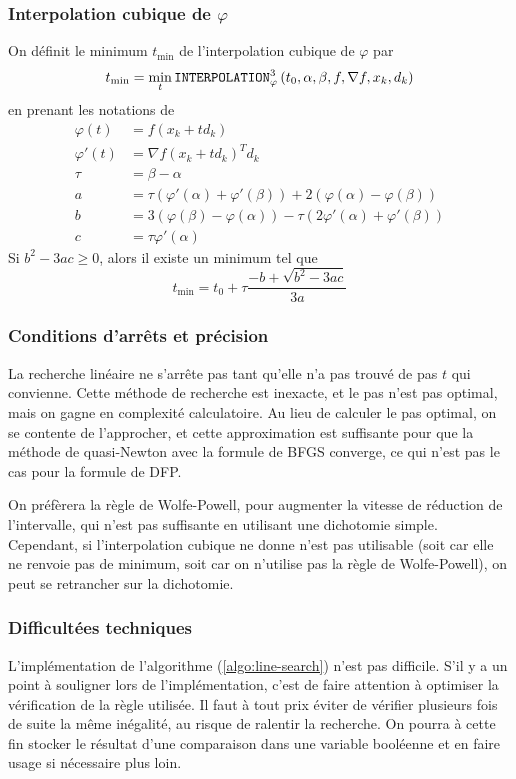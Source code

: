 \documentclass[3p, twocolumn]{elsarticle}
\begin{document}
\subsubsection{Interpolation cubique de $\varphi$}
On définit le minimum $t_{\min}$ de l'interpolation cubique de $\varphi$ par 
\[t_{\min} = \underset{t}\min\, \textrm{\texttt{INTERPOLATION}}^3_{\varphi}\left(t_0, \alpha, \beta, f, \nabla f, x_k, d_k\right)\]
 en prenant les notations de \cite{poly:mottelet2003}
\begin{align*}
    \varphi(t) &= f(x_k+td_k)\\
    \varphi'(t) &= \nabla f(x_k+td_k)^Td_k\\
    \tau &= \beta-\alpha\\
    a &= \tau(\varphi'(\alpha)+\varphi'(\beta))+2(\varphi(\alpha)-\varphi(\beta))\\
    b &= 3(\varphi(\beta)-\varphi(\alpha))-\tau(2\varphi'(\alpha)+\varphi'(\beta))\\
    c &= \tau\varphi'(\alpha)
\end{align*}
Si $b^2-3ac \geq 0$, alors il existe un minimum tel que 
\begin{equation}
    t_{\min} = t_0 + \tau\frac{-b+\sqrt{b^2-3ac}}{3a}
    \label{eq:min-interp-3}
\end{equation}
\subsubsection{Conditions d'arrêts et précision}
La recherche linéaire ne s'arrête pas tant qu'elle n'a pas trouvé de pas $t$ qui convienne. Cette méthode de recherche est inexacte, et le pas n'est pas optimal, mais on gagne en complexité calculatoire. Au lieu de calculer le pas optimal, on se contente de l'approcher, et cette approximation est suffisante pour que la méthode de quasi-Newton avec la formule de BFGS converge, ce qui n'est pas le cas pour la formule de DFP.

On préfèrera la règle de Wolfe-Powell, pour augmenter la vitesse de réduction de l'intervalle, qui n'est pas suffisante en utilisant une dichotomie simple. Cependant, si l'interpolation cubique ne donne n'est pas utilisable (soit car elle ne renvoie pas de minimum, soit car on n'utilise pas la règle de Wolfe-Powell), on peut se retrancher sur la dichotomie.

\subsubsection{Difficultées techniques}
L'implémentation de l'algorithme (\ref{algo:line-search}) n'est pas difficile. S'il y a un point à souligner lors de l'implémentation, c'est de faire attention à optimiser la vérification de la règle utilisée. Il faut à tout prix éviter de vérifier plusieurs fois de suite la même inégalité, au risque de ralentir la recherche. On pourra à cette fin stocker le résultat d'une comparaison dans une variable booléenne et en faire usage si nécessaire plus loin.
\end{document}
